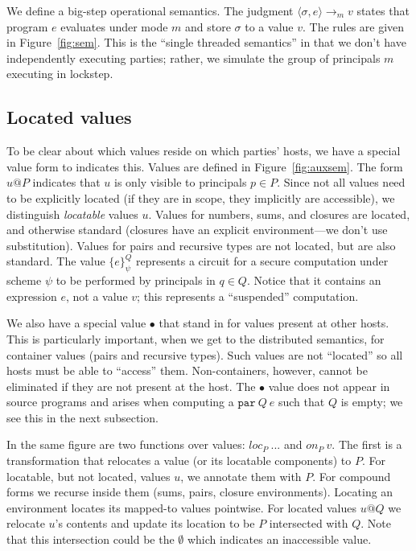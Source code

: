 \documentclass[10pt]{article}
\makeatletter
\newcommand{\kw}[1]{\ensuremath{\mathtt{#1}}}
\newcommand{\epar}[2]{\ensuremath{\kw{par}~{#1}~{#2}}}
\newcommand{\vshare}[3]{\ensuremath{\{{#3}\}^{#1}_{#2}}}
\newcommand{\vloc}[2]{\ensuremath{{#1}\kw{@}{#2}}}
\newcommand{\vcrash}{\ensuremath{\bullet}}
\newcommand{\eval}[4]{\ensuremath{\config{#1}{#3} \longrightarrow_{#2} {#4}}}
\newcommand{\env}{\ensuremath{\sigma}}
\newcommand{\config}[2]{\ensuremath{\langle{#1},{#2}\rangle}}
\newcommand{\locof}[2]{\ensuremath{\mathit{loc}_{#1}~{#2}}}
\newcommand{\getat}[2]{\ensuremath{\mathit{on}_{#1}~{#2}}}
\makeatother
\begin{document}
We define a big-step operational semantics. The judgment
$\eval{\env}{m}{e}{v}$ states that program
$e$ evaluates under mode $m$ and store $\env$ to a value
$v$. The rules are given in Figure~\ref{fig:sem}.  This is the
``single threaded semantics'' in that we don't have independently
executing parties; rather, we simulate the group of principals
$m$ executing in lockstep.

\subsection{Located values}

To be clear about which values reside on which parties' hosts, we have
a special value form to indicates this. Values are defined in
Figure~\ref{fig:auxsem}. The form $\vloc{u}{P}$ indicates that $u$ is
only visible to principals $p \in P$. Since not all values need to be
explicitly located (if they are in scope, they implicitly are
accessible), we distinguish \emph{locatable} values $u$.  Values for
numbers, sums, and closures are located, and otherwise standard
(closures have an explicit environment---we don't use
substitution). Values for pairs and recursive types are not located,
but are also standard. The value $\vshare{Q}{\psi}{e}$ represents a
circuit for a secure computation under scheme $\psi$ to be performed
by principals in $q \in Q$. Notice that it contains an expression $e$,
not a value $v$; this represents a ``suspended'' computation.

We also have a special value $\vcrash$ that stand in for values
present at other hosts. This is particularly important, when we get to
the distributed semantics, for container values (pairs and recursive
types). Such values are not ``located'' so all hosts must be able to
``access'' them. Non-containers, however, cannot be eliminated if they
are not present at the host. The $\vcrash$ value does not appear in
source programs and arises when computing a $\epar{Q}{e}$ such that
$Q$ is empty; we see this in the next subsection.

In the same figure are two functions over values: $\locof{P}{...}$ and
$\getat{P}{v}$. The first is a transformation that relocates a value
(or its locatable components) to $P$. For locatable, but not located, values $u$,
we annotate them with $P$. For compound forms we recurse inside them
(sums, pairs, closure environments). Locating an environment locates
its mapped-to values pointwise.  For located values $\vloc{u}{Q}$ we
relocate $u$'s contents and update its location to be $P$ intersected
with $Q$. Note that this intersection could be the $\emptyset$ which
indicates an inaccessible value.
\end{document}
